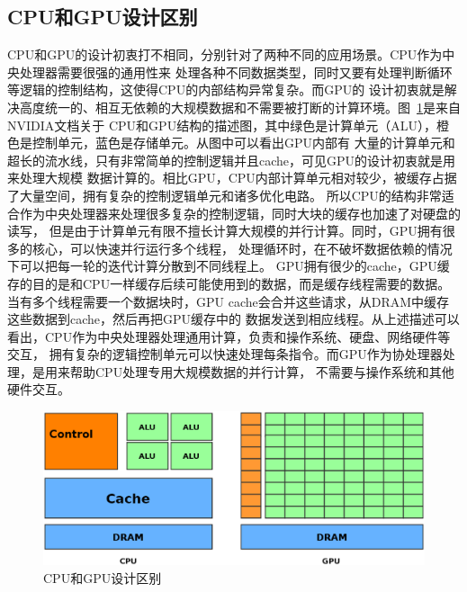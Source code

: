 \subsection{CPU和GPU设计区别}
CPU和GPU的设计初衷打不相同，分别针对了两种不同的应用场景。CPU作为中央处理器需要很强的通用性来
处理各种不同数据类型，同时又要有处理判断循环等逻辑的控制结构，这使得CPU的内部结构异常复杂。而GPU的
设计初衷就是解决高度统一的、相互无依赖的大规模数据和不需要被打断的计算环境。图~\ref{figure1}是来自NVIDIA文档关于
CPU和GPU结构的描述图，其中绿色是计算单元（ALU），橙色是控制单元，蓝色是存储单元。从图中可以看出GPU内部有
大量的计算单元和超长的流水线，只有非常简单的控制逻辑并且cache，可见GPU的设计初衷就是用来处理大规模
数据计算的。相比GPU，CPU内部计算单元相对较少，被缓存占据了大量空间，拥有复杂的控制逻辑单元和诸多优化电路。
所以CPU的结构非常适合作为中央处理器来处理很多复杂的控制逻辑，同时大块的缓存也加速了对硬盘的读写，
但是由于计算单元有限不擅长计算大规模的并行计算。同时，GPU拥有很多的核心，可以快速并行运行多个线程，
处理循环时，在不破坏数据依赖的情况下可以把每一轮的迭代计算分散到不同线程上。
GPU拥有很少的cache，GPU缓存的目的是和CPU一样缓存后续可能使用到的数据，而是缓存线程需要的数据。
当有多个线程需要一个数据块时，GPU cache会合并这些请求，从DRAM中缓存这些数据到cache，然后再把GPU缓存中的
数据发送到相应线程。从上述描述可以看出，CPU作为中央处理器处理通用计算，负责和操作系统、硬盘、网络硬件等交互，
拥有复杂的逻辑控制单元可以快速处理每条指令。而GPU作为协处理器处理，是用来帮助CPU处理专用大规模数据的并行计算，
不需要与操作系统和其他硬件交互。
\begin{figure}
\centering
\includegraphics[width=0.9\linewidth]{figure1.eps}
\caption{CPU和GPU设计区别}\label{figure1}
\end{figure}

